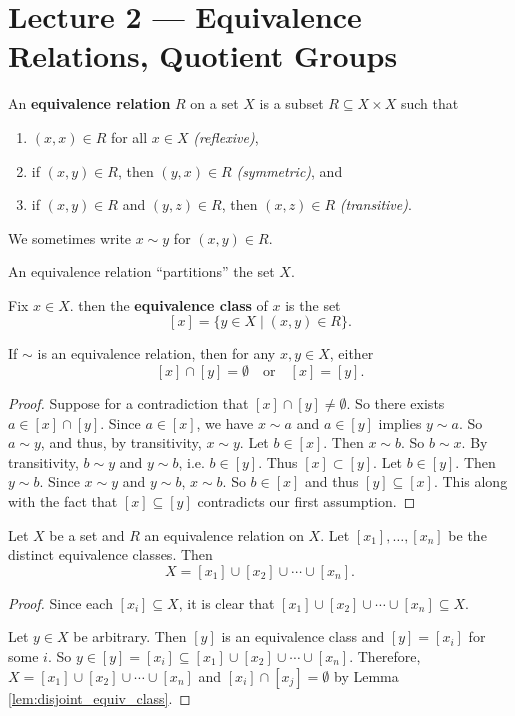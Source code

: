 \section{Lecture 2 — Equivalence Relations, Quotient Groups}

\begin{definition}
	An \textbf{equivalence relation} $R$ on a set $X$ is a subset $R\subseteq X\times X$ such that
	\begin{enumerate}
		\item $(x,x)\in R$ for all $x\in X$ \textit{(reflexive)},
		\item if $(x,y)\in R$, then $(y,x)\in R$ \textit{(symmetric)}, and
		\item if $(x,y)\in R$ and $(y,z)\in R$, then $(x,z)\in R$ \textit{(transitive)}.
	\end{enumerate}
	We sometimes write $x\sim y$ for $(x,y)\in R$.
\end{definition}

An equivalence relation ``partitions'' the set $X$.

Fix $x\in X$. then the \textbf{equivalence class} of $x$ is the set
$$[x]=\{y\in X\mid (x,y)\in R\}.$$

\begin{lemma}\label{lem:disjoint_equiv_class}
	If $\sim$ is an equivalence relation, then for any $x,y\in X$, either
	$$[x]\cap[y]=\emptyset\quad\text{or}\quad[x]=[y].$$
\end{lemma}

\begin{proof}
	Suppose for a contradiction that $[x]\cap[y]\neq\emptyset$. So there exists $a\in[x]\cap[y]$. Since $a\in[x]$, we have $x\sim a$ and $a\in[y]$ implies $y\sim a$. So $a\sim y$, and thus, by transitivity, $x\sim y$. Let $b\in[x]$. Then $x\sim b$. So $b\sim x$. By transitivity, $b\sim y$ and $y\sim b$, i.e. $b\in[y]$. Thus $[x]\subset[y]$. Let $b\in [y]$. Then $y\sim b$. Since $x\sim y$ and $y\sim b$, $x\sim b$. So $b\in[x]$ and thus $[y]\subseteq[x]$. This along with the fact that $[x]\subseteq[y]$ contradicts our first assumption.
\end{proof}

\begin{theorem}
	Let $X$ be a set and $R$ an equivalence relation on $X$. Let $[x_1],\hdots,[x_n]$ be the distinct equivalence classes. Then
	$$X=[x_1]\cup[x_2]\cup\cdots\cup[x_n].$$
\end{theorem}

\begin{proof}
	Since each $[x_i]\subseteq X$, it is clear that $[x_1]\cup[x_2]\cup\cdots\cup[x_n]\subseteq X$.

	Let $y\in X$ be arbitrary. Then $[y]$ is an equivalence class and $[y]=[x_i]$ for some $i$. So $y\in[y]=[x_i]\subseteq [x_1]\cup[x_2]\cup\cdots\cup[x_n]$. Therefore, $X=[x_1]\cup[x_2]\cup\cdots\cup[x_n]$ and $[x_i]\cap[x_j]=\emptyset$ by Lemma \ref{lem:disjoint_equiv_class}.
\end{proof}

